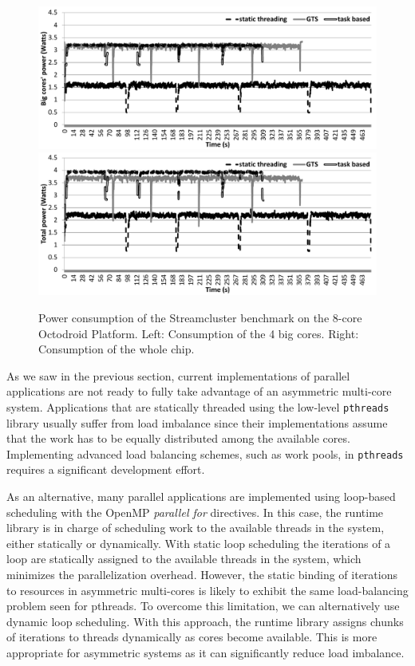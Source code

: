 \begin{figure}
        \centering
        \includegraphics[width=\columnwidth]{figures/stream_samples_A15} \hspace{0.2cm}
        \includegraphics[width=\columnwidth]{figures/stream_samples_total}%
        \vspace{-0.cm}
        \caption{Power consumption of the Streamcluster benchmark on the 8-core Octodroid Platform. 
Left: Consumption of the 4 big cores. Right: Consumption of the whole chip.}%
        \label{fig:streamcluster_consumption_evolution}%
\end{figure}

As we saw in the previous section, current implementations of parallel applications are not 
ready to fully take advantage of an asymmetric multi-core system.
Applications that are statically threaded using the low-level \texttt{pthreads} library usually 
suffer from load imbalance since their implementations assume that the work has to be equally 
distributed among the available cores. Implementing advanced load balancing schemes, such as
work pools, in \texttt{pthreads} requires a significant development effort.

As an alternative, many parallel applications are implemented using loop-based scheduling with the 
OpenMP \emph{parallel for} directives. In this case, the runtime library is in charge of scheduling 
work to the available threads in the system, either statically or dynamically.
With static loop scheduling the iterations of a loop are statically assigned to the available 
threads in the system, which minimizes the parallelization overhead. However, the static 
binding of iterations to resources in asymmetric multi-cores is likely to exhibit the same load-balancing 
problem seen for pthreads. 
To overcome this limitation, we can alternatively use dynamic loop scheduling. With this approach, the runtime 
library assigns chunks of iterations to threads dynamically as cores become available. This is more 
appropriate for asymmetric systems as it can significantly reduce load imbalance. 

